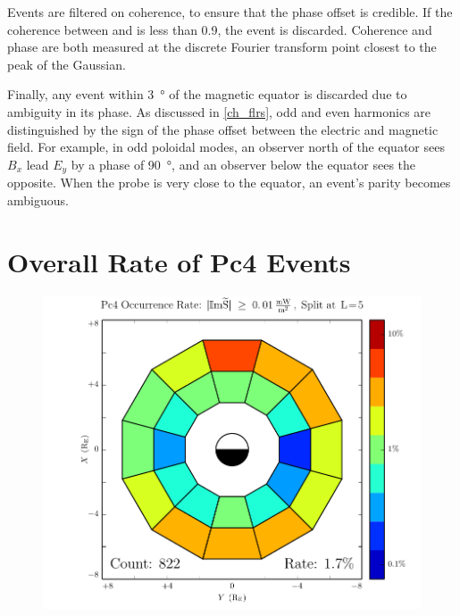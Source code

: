 
Events are filtered on coherence, to ensure that the phase offset is credible. If the coherence between  and  is less than 0.9, the event is discarded. Coherence and phase are both measured at the discrete Fourier transform point closest to the peak of the Gaussian. 

Finally, any event within \SI{3}{\degree} of the magnetic equator is discarded due to ambiguity in its phase. As discussed in \cref{ch_flrs}, odd and even harmonics are distinguished by the sign of the phase offset between the electric and magnetic field. For example, in odd poloidal modes, an observer north of the equator sees $B_x$ lead $E_y$ by a phase of \SI{90}{\degree}, and an observer below the equator sees the opposite. When the probe is very close to the equator, an event's parity becomes ambiguous. 


\section{Overall Rate of Pc4 Events}
  \label{sec_total}

\begin{figure}[!htb]
    \centering
    \includegraphics[width=\textwidth]{figures/rate_all.pdf}
    \caption[Pc4 Rate]{
    }
    \label{fig_rate_all}
\end{figure}

